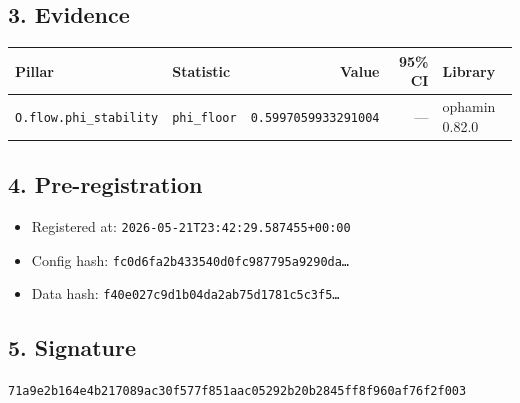 \documentclass{article}
\begin{document}
\subsection*{3. Evidence}
\begin{tabular}{llrrl}\toprule
\textbf{Pillar} & \textbf{Statistic} & \textbf{Value} & \textbf{95\% CI} & \textbf{Library} \\\midrule
\texttt{O.flow.phi\_stability} & \texttt{phi\_floor} & \texttt{0.5997059933291004} & --- & ophamin 0.82.0 \\
\bottomrule\end{tabular}
\subsection*{4. Pre-registration}
\begin{itemize}
\item Registered at: \texttt{2026-05-21T23:42:29.587455+00:00}
\item Config hash: \texttt{fc0d6fa2b433540d0fc987795a9290da\dots}
\item Data hash: \texttt{f40e027c9d1b04da2ab75d1781c5c3f5\dots}
\end{itemize}
\subsection*{5. Signature}
\texttt{71a9e2b164e4b217089ac30f577f851aac05292b20b2845ff8f960af76f2f003}\\
\end{document}

